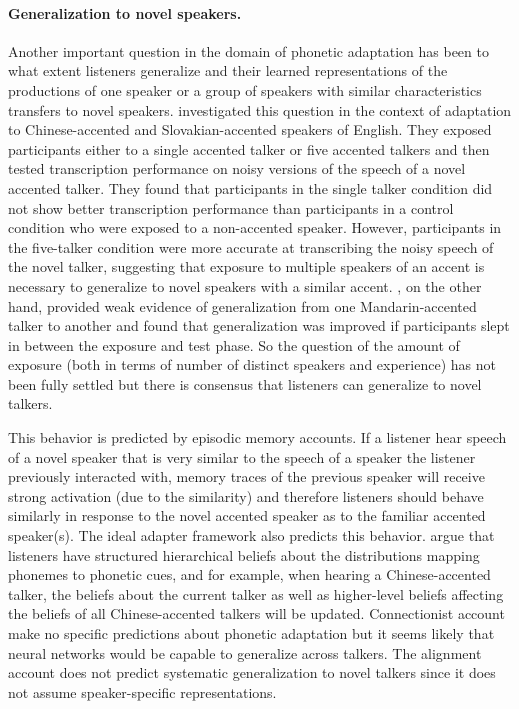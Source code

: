 \paragraph{Generalization to novel speakers.}  Another important question in the domain of phonetic adaptation has been
to what extent listeners generalize and  their learned representations  of the productions of one speaker or a group of speakers with similar 
characteristics transfers to novel speakers. \cite{BradlowBent2008} investigated this question in the context of adaptation to Chinese-accented and Slovakian-accented
speakers of English. They exposed participants either to a single accented talker or five accented talkers and then tested
transcription performance on noisy versions of the speech of a novel accented talker. They found that participants in the single talker condition
did not show better transcription performance than participants in a control condition who were exposed to a non-accented speaker. However, participants
in the five-talker condition were more accurate at transcribing the noisy speech of the novel talker, suggesting that exposure to multiple speakers of an accent is necessary
to generalize to novel speakers with a similar accent. \cite{XieEarleMyers2018}, on the other hand, provided weak evidence of generalization from one Mandarin-accented talker 
to another and found that generalization was improved if participants slept in between the exposure and test phase. So the question of the amount of exposure (both in terms of number
of distinct speakers and experience) has not been fully settled but there is consensus that listeners can generalize to novel talkers.

This behavior is predicted by episodic memory accounts. If a listener hear speech of a novel speaker that is very similar to the speech of a speaker the listener previously interacted with, 
memory traces of the previous speaker will receive strong activation (due to the similarity) and therefore listeners should behave similarly in response to the 
novel accented speaker as to the familiar accented speaker(s). The ideal adapter framework also predicts this behavior. \cite{KleinschmidtJaeger2015,Kleinschmidt2018} 
argue that listeners have structured hierarchical beliefs about the distributions mapping phonemes to phonetic cues, and for example, when hearing a Chinese-accented talker, 
the beliefs about the current talker as well as higher-level beliefs affecting the beliefs of all Chinese-accented talkers will be updated. Connectionist account make no specific predictions
about phonetic adaptation but it seems likely that neural networks would be capable to generalize across talkers. The alignment account does not predict systematic
generalization to novel talkers since it does not assume speaker-specific representations.

